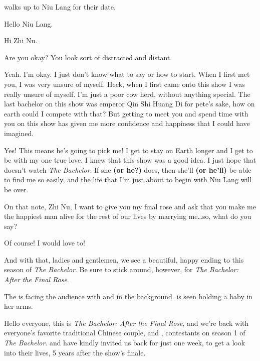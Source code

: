 \documentclass[letterpaper,12pt]{memoir}
\begin{document}
\scene{}

\begin{dida}
  \zhinuname{} walks up to Niu Lang for their date.
\end{dida}

\zhinu%
Hello Niu Lang.

\niulang%
Hi Zhi Nu.

\zhinu%
Are you okay? You look sort of distracted and distant.

\niulang%
Yeah. I'm okay. I just don't know what to say or how to start. When I first met you, I was very unsure of myself. Heck, when I first came onto this show I was really unsure of myself. I'm just a poor cow herd, without anything special. The last bachelor on this show was emperor Qin Shi Huang Di for pete's sake, how on earth could I compete with that? But getting to meet you and spend time with you on this show has given me more confidence and happiness that I could have imagined.

Yes! This means he's going to pick me! I get to stay on Earth longer and I get to be with my one true love. I knew that this show was a good idea. I just hope that \niangniangname{} doesn't watch \textit{The Bachelor}. If she \textbf{(or he?)} does, then she'll \textbf{(or he'll)} be able to find me so easily, and the life that I'm just about to begin with Niu Lang will be over.

\niulang%
On that note, Zhi Nu, I want to give you my final rose and ask that you make me the happiest man alive for the rest of our lives by marrying me\dots so, what do you say?

Of course! I would love to!

\host%
And with that, ladies and gentlemen, we see a beautiful, happy ending to this season of \textit{The Bachelor}. Be sure to stick around, however, for \textit{The Bachelor: After the Final Rose}.



\begin{dida}
  The \hostname{} is facing the audience with \niulangname{} and \zhinuname{} in the background. \zhinuname{} is seen holding a baby in her arms.
\end{dida}

Hello everyone, this is \textit{The Bachelor: After the Final Rose}, and we're back with everyone's favorite traditional Chinese couple, \niulangname{} and \zhinuname{}, contestants on season 1 of \textit{The Bachelor}. \niulangname{} and \zhinuname{} have kindly invited us back for just one week, to get a look into their lives, 5 years after the show's finale.
\end{document}
